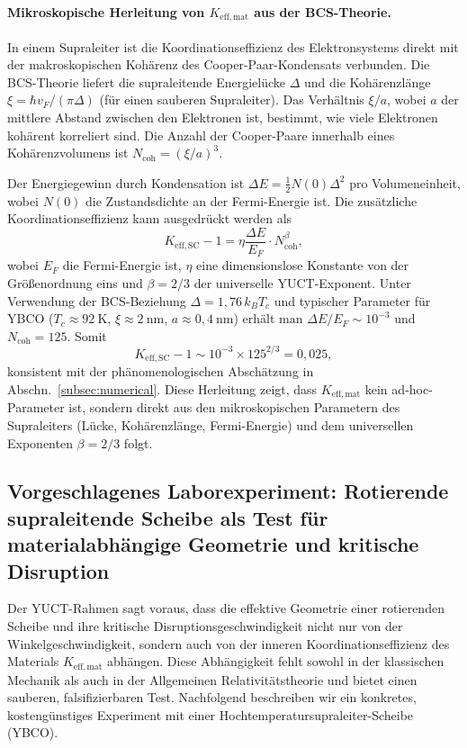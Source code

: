 \documentclass[12pt,a4paper]{article}
\begin{document}
	\paragraph{Mikroskopische Herleitung von \(K_{\mathrm{eff,mat}}\) aus der BCS-Theorie.}
	In einem Supraleiter ist die Koordinationseffizienz des Elektronsystems direkt mit der makroskopischen Kohärenz des Cooper-Paar-Kondensats verbunden. Die BCS-Theorie liefert die supraleitende Energielücke \(\Delta\) und die Kohärenzlänge \(\xi = \hbar v_F / (\pi \Delta)\) (für einen sauberen Supraleiter). Das Verhältnis \(\xi / a\), wobei \(a\) der mittlere Abstand zwischen den Elektronen ist, bestimmt, wie viele Elektronen kohärent korreliert sind. Die Anzahl der Cooper-Paare innerhalb eines Kohärenzvolumens ist \(N_{\text{coh}} = (\xi/a)^3\).
	
	Der Energiegewinn durch Kondensation ist \(\Delta E = \frac{1}{2} N(0) \Delta^2\) pro Volumeneinheit, wobei \(N(0)\) die Zustandsdichte an der Fermi-Energie ist. Die zusätzliche Koordinationseffizienz kann ausgedrückt werden als
	\[
	K_{\mathrm{eff,SC}} - 1 = \eta \frac{\Delta E}{E_F} \cdot N_{\text{coh}}^{\beta},
	\]
	wobei \(E_F\) die Fermi-Energie ist, \(\eta\) eine dimensionslose Konstante von der Größenordnung eins und \(\beta = 2/3\) der universelle YUCT-Exponent. Unter Verwendung der BCS-Beziehung \(\Delta = 1,76 \, k_B T_c\) und typischer Parameter für YBCO (\(T_c \approx 92\ \text{K}\), \(\xi \approx 2\ \text{nm}\), \(a \approx 0,4\ \text{nm}\)) erhält man \(\Delta E/E_F \sim 10^{-3}\) und \(N_{\text{coh}} = 125\). Somit
	\[
	K_{\mathrm{eff,SC}} - 1 \sim 10^{-3} \times 125^{2/3} = 0,025,
	\]
	konsistent mit der phänomenologischen Abschätzung in Abschn.~\ref{subsec:numerical}. Diese Herleitung zeigt, dass \(K_{\mathrm{eff,mat}}\) kein ad‑hoc-Parameter ist, sondern direkt aus den mikroskopischen Parametern des Supraleiters (Lücke, Kohärenzlänge, Fermi-Energie) und dem universellen Exponenten \(\beta = 2/3\) folgt.
	
	\subsection{Vorgeschlagenes Laborexperiment: Rotierende supraleitende Scheibe als Test für materialabhängige Geometrie und kritische Disruption}
	
	Der YUCT-Rahmen sagt voraus, dass die effektive Geometrie einer rotierenden Scheibe und ihre kritische Disruptionsgeschwindigkeit nicht nur von der Winkelgeschwindigkeit, sondern auch von der inneren Koordinationseffizienz des Materials \(K_{\mathrm{eff,mat}}\) abhängen. Diese Abhängigkeit fehlt sowohl in der klassischen Mechanik als auch in der Allgemeinen Relativitätstheorie und bietet einen sauberen, falsifizierbaren Test. Nachfolgend beschreiben wir ein konkretes, kostengünstiges Experiment mit einer Hochtemperatursupraleiter-Scheibe (YBCO).
	
\end{document}
